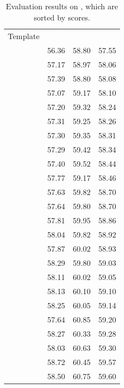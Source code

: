 \documentclass[11pt]{article}
\begin{document}
\begin{table*}[]
\small
    \centering
    \begin{tabular}{c|ccc}
    \toprule
    \multirow{2}{*}{Template} & \multicolumn{3}{c}{} \\ 
    &  &  &  \\
    \midrule
        & 56.36 & 58.80 & 57.55 \\
        & 57.17 & 58.97 & 58.06 \\
        & 57.39 & 58.80 & 58.08 \\
        & 57.07 & 59.17 & 58.10 \\
        & 57.20 & 59.32 & 58.24 \\
        & 57.31 & 59.25 & 58.26 \\
        & 57.30 & 59.35 & 58.31 \\
        & 57.29 & 59.42 & 58.34 \\
        & 57.40 & 59.52 & 58.44 \\
        & 57.77 & 59.17 & 58.46 \\
        & 57.63 & 59.82 & 58.70 \\
        & 57.64 & 59.80 & 58.70 \\
        & 57.81 & 59.95 & 58.86 \\
        & 58.04 & 59.82 & 58.92 \\
        & 57.87 & 60.02 & 58.93 \\
        & 58.29 & 59.80 & 59.03 \\
        & 58.11 & 60.02 & 59.05 \\
        & 58.13 & 60.10 & 59.10 \\
        & 58.25 & 60.05 & 59.14 \\
        & 57.64 & 60.85 & 59.20 \\
        & 58.27 & 60.33 & 59.28 \\
        & 58.03 & 60.63 & 59.30 \\
        & 58.72 & 60.45 & 59.57 \\
        & 58.50 & 60.75 & 59.60 \\
\bottomrule
    \end{tabular}
    \caption{Evaluation results on , which are sorted by  scores.}
    \label{table:rest16_appendix}
\end{table*}
\end{document}
